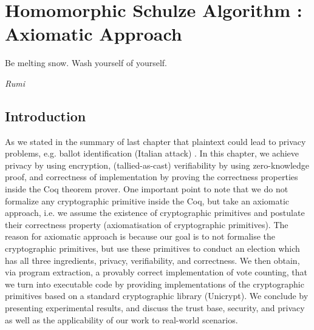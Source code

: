 \chapter{Homomorphic Schulze Algorithm : Axiomatic Approach}
\label{cha:homormorphic_schulze}

\epigraph{Be melting snow. Wash yourself of yourself.} 
{\textit{Rumi}} 

\section{Introduction}
As we stated in the  summary of last chapter that plaintext could lead to 
privacy problems, e.g. ballot identification (Italian attack) \cite{Otten}. 
In this chapter, we achieve privacy by using encryption, (tallied-as-cast) 
verifiability by using zero-knowledge proof, and correctness of implementation 
by proving the correctness properties inside the Coq theorem prover. 
One important point to note that we do not formalize any cryptographic primitive inside the Coq, but 
take an axiomatic approach, i.e. we assume the existence of cryptographic 
primitives and postulate their correctness property (axiomatisation of 
cryptographic primitives).  The reason for axiomatic approach is
because our goal is to not formalise the cryptographic primitives, but use these primitives
to conduct an election which has all three ingredients, privacy, verifiability, 
and correctness. We then obtain, via program extraction, a
provably correct implementation of vote counting, that we turn
into executable code by providing implementations of the cryptographic primitives
based on a standard cryptographic library (Unicrypt). 
We conclude by presenting
experimental results, and discuss the trust base, security, and
privacy as well as the applicability of our work to real-world
scenarios. 




